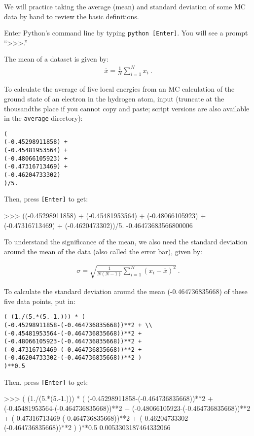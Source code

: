 We will practice taking the average (mean) and standard deviation of some MC data by hand to review the basic definitions.

Enter Python's command line by typing \texttt{python [Enter]}.
You will see a prompt ``\textgreater\textgreater\textgreater.''

The mean of a dataset is given by:
\begin{align}
  \overline{x} = \frac{1}{N}\sum_{i=1}^{N} x_i\:.
\end{align}

To calculate the average of five local energies from an MC calculation of the
ground state of an electron in the hydrogen atom, input (truncate at the
thousandths place if you cannot copy and paste; script versions are also
available in the \texttt{average} directory): 

\begin{lstlisting}[style=SHELL]
(
(-0.45298911858) + 
(-0.45481953564) + 
(-0.48066105923) + 
(-0.47316713469) + 
(-0.46204733302)
)/5.
\end{lstlisting} 

Then, press \texttt{[Enter]} to get:

\begin{shade}
>>> ((-0.45298911858) + (-0.45481953564) + (-0.48066105923) + 
(-0.47316713469) + (-0.4620473302))/5.  
-0.46473683566800006
\end{shade}

To understand the significance of the mean, we also need the standard deviation
around the mean of the data (also called the error bar), given by:

\begin{align}
  \sigma = \sqrt{\frac{1}{N(N-1)}\sum_{i=1}^{N} ({x_i} - \overline{x})^2}\:.
\end{align}

To calculate the standard deviation around the mean (-0.464736835668) of these
five data points, put in: 

\begin{lstlisting}[style=SHELL]
( (1./(5.*(5.-1.))) * ( 
(-0.45298911858-(-0.464736835668))**2 + \\
(-0.45481953564-(-0.464736835668))**2 + 
(-0.48066105923-(-0.464736835668))**2 + 
(-0.47316713469-(-0.464736835668))**2 + 
(-0.46204733302-(-0.464736835668))**2 ) 
)**0.5
\end{lstlisting} 

Then, press \texttt{[Enter]} to get:

\begin{shade}
>>> ( (1./(5.*(5.-1.))) * ( (-0.45298911858-(-0.464736835668))**2 +
(-0.45481953564-(-0.464736835668))**2 + (-0.48066105923-(-0.464736835668))**2 + 
(-0.47316713469-(-0.464736835668))**2 + (-0.46204733302-(-0.464736835668))**2 
) )**0.5
0.0053303187464332066
\end{shade}

